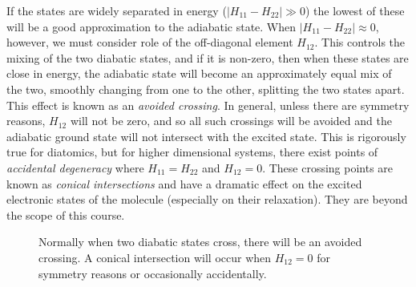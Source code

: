 \documentclass{article}
\theoremstyle{plain}\theoremheaderfont{\normalfont\itshape}\theorembodyfont{\rmfamily}\theoremseparator{.}\newtheorem*{rem}{Remark}\newtheorem*{ex}{Example}\newtheorem*{proof}{Proof}\newtheorem*{altp}{Alternative proof}
\theoremstyle{plain}\theoremheaderfont{\normalfont\bfseries}\theorembodyfont{\rmfamily}\theoremseparator{.}\newtheorem{thm}{Theorem}[section]\newtheorem{lem}[thm]{Lemma}\newtheorem{prop}[thm]{Proposition}\newtheorem*{cor}{Corollary}\newtheorem{defn}[thm]{Definition}\newtheorem{clm}[thm]{Claim}\newtheorem{clminproof}{Claim}\newtheorem{pos}{Postulate}[section]
\theoremstyle{break}\theoremheaderfont{\normalfont\itshape}\theorembodyfont{\rmfamily}\theoremseparator{.\medskip}\newtheorem*{proofskip}{Proof}\newtheorem*{exs}{Examples}\newtheorem*{rems}{Remarks}
\theoremstyle{break}\theoremheaderfont{\normalfont\bfseries}\theorembodyfont{\rmfamily}\theoremseparator{.\medskip}\newtheorem{lemskip}[thm]{Lemma}\newtheorem{defnskip}[thm]{Definition}\newtheorem{propskip}[thm]{Proposition}\newtheorem{thmskip}[thm]{Theorem}
\numberwithin{equation}{section}
\newcommand{\abs}[1]{\left| #1 \right|}
\begin{document}
    If the states are widely separated in energy (\(\abs{H_{11}-H_{22}}\gg 0\)) the lowest of these will be a good approximation to the adiabatic state. When \(\abs{H_{11}-H_{22}}\approx 0\), however, we must consider role of the off-diagonal element \(H_{12}\). This controls the mixing of the two diabatic states, and if it is non-zero, then when these states are close in energy, the adiabatic state will become an approximately equal mix of the two, smoothly changing from one to the other, splitting the two states apart. This effect is known as an \textit{avoided crossing}. In general, unless there are symmetry reasons, \(H_{12}\) will not be zero, and so all such crossings will be avoided and the adiabatic ground state will not intersect with the excited state. This is rigorously true for diatomics, but for higher dimensional systems, there exist points of \textit{accidental degeneracy} where \(H_{11}=H_{22}\) and \(H_{12}=0\). These crossing points are known as \textit{conical intersections} and have a dramatic effect on the excited electronic states of the molecule (especially on their relaxation). They are beyond the scope of this course.

    \begin{figure}
        \centering
        \caption{Normally when two diabatic states cross, there will be an avoided crossing. A conical intersection will occur when \(H_{12}=0\) for symmetry reasons or occasionally accidentally.}
    \end{figure}
\end{document}
